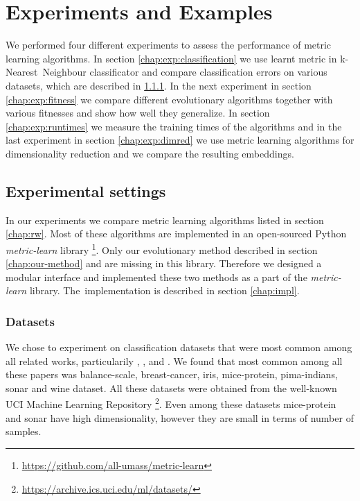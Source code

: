 \documentclass[12pt,a4paper]{report}
\begin{document}

\chapter{Experiments and Examples}
We performed four different experiments to assess the performance of metric learning algorithms. In section \ref{chap:exp:classification} we use learnt metric in k-Nearest~Neighbour classificator and compare classification errors on various datasets, which are described in \ref{chap:exp:datasets}. In the next experiment in section \ref{chap:exp:fitness} we compare different evolutionary algorithms together with various fitnesses and show how well they generalize. In section \ref{chap:exp:runtimes} we measure the training times of the algorithms and in the last experiment in section \ref{chap:exp:dimred} we use metric learning algorithms for dimensionality reduction and we compare the resulting embeddings.

\section{Experimental settings} 
In our experiments we compare metric learning algorithms listed in section \ref{chap:rw}. Most of these algorithms are implemented in an open-sourced Python \textit{metric-learn} library \footnote{\url{https://github.com/all-umass/metric-learn}}. Only our evolutionary method described in section \ref{chap:our-method} and \cite{fukui2013evolutionary} are missing in this library. Therefore we designed a modular interface and implemented these two methods as a part of the \textit{metric-learn} library. The~implementation is described in section \ref{chap:impl}.

\subsection{Datasets} \label{chap:exp:datasets}
We chose to experiment on classification datasets that were most common among all related works, particularily \cite{xing2002distance}, \cite{weinberger2009distance}, \cite{jacobgoldberger2004neighbourhood} and \cite{fukui2013evolutionary}. We found that most common among all these papers was balance-scale, breast-cancer, iris, mice-protein, pima-indians, sonar and wine dataset. All these datasets were obtained from the well-known UCI Machine Learning Repository \footnote{\url{https://archive.ics.uci.edu/ml/datasets/}}. Even among these datasets mice-protein and sonar  have high dimensionality, however they are small in terms of number of samples.
\end{document}
